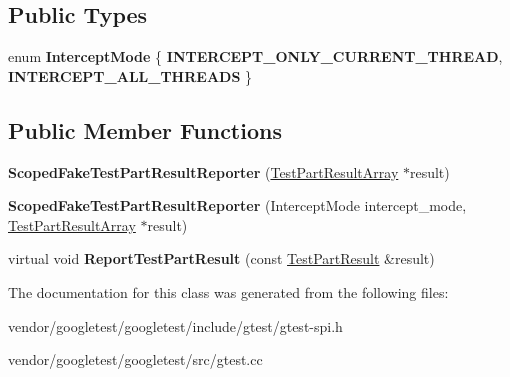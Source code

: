 \subsection*{Public Types}
\begin{DoxyCompactItemize}
\item 
\mbox{\label{classtesting_1_1_scoped_fake_test_part_result_reporter_a82f6209b3cf5c4b15ec8bd8041dbc2d5}} 
enum {\bfseries Intercept\+Mode} \{ {\bfseries I\+N\+T\+E\+R\+C\+E\+P\+T\+\_\+\+O\+N\+L\+Y\+\_\+\+C\+U\+R\+R\+E\+N\+T\+\_\+\+T\+H\+R\+E\+AD}, 
{\bfseries I\+N\+T\+E\+R\+C\+E\+P\+T\+\_\+\+A\+L\+L\+\_\+\+T\+H\+R\+E\+A\+DS}
 \}
\end{DoxyCompactItemize}
\subsection*{Public Member Functions}
\begin{DoxyCompactItemize}
\item 
\mbox{\label{classtesting_1_1_scoped_fake_test_part_result_reporter_aa0100ecf4799fb51d45167be6a5de1d5}} 
{\bfseries Scoped\+Fake\+Test\+Part\+Result\+Reporter} (\mbox{\hyperlink{classtesting_1_1_test_part_result_array}{Test\+Part\+Result\+Array}} $\ast$result)
\item 
\mbox{\label{classtesting_1_1_scoped_fake_test_part_result_reporter_a57cbc09ed48627c8a73e622618dc4b4f}} 
{\bfseries Scoped\+Fake\+Test\+Part\+Result\+Reporter} (Intercept\+Mode intercept\+\_\+mode, \mbox{\hyperlink{classtesting_1_1_test_part_result_array}{Test\+Part\+Result\+Array}} $\ast$result)
\item 
\mbox{\label{classtesting_1_1_scoped_fake_test_part_result_reporter_a82531434f51632d98ed7cdcdb10b8b92}} 
virtual void {\bfseries Report\+Test\+Part\+Result} (const \mbox{\hyperlink{classtesting_1_1_test_part_result}{Test\+Part\+Result}} \&result)
\end{DoxyCompactItemize}


The documentation for this class was generated from the following files\+:\begin{DoxyCompactItemize}
\item 
vendor/googletest/googletest/include/gtest/gtest-\/spi.\+h\item 
vendor/googletest/googletest/src/gtest.\+cc\end{DoxyCompactItemize}

